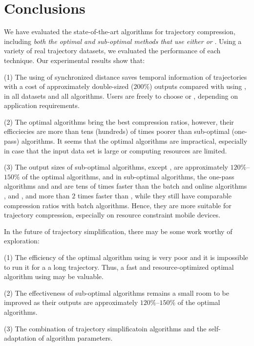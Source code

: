 \vspace{-1ex}
\section{Conclusions}

We have evaluated the state-of-the-art \lsa algorithms for trajectory compression, including \emph{both the optimal and sub-optimal methods that use either \ped or \sed}. 
Using a variety of real trajectory datasets, we evaluated the performance of each technique. %
Our experimental results show that: 

(1) The using of synchronized distance \sed saves temporal information of trajectories with a cost of approximately double-sized (\ie $200\%$) outputs compared with using \ped, in all datasets and all algorithms. Users are freely to choose \sed or \ped, depending on application requirements.

(2) The optimal algorithms bring the best compression ratios, however, their efficciecies are more than tens (hundreds) of times poorer than sub-optimal (one-pass) algorithms. It seems that the optimal algorithms are impractical, especially in case that the input data set is large or computing resources are limited.

(3) The output sizes of sub-optimal algorithms, except \squishe, are approximately $120\%$--$150\%$ of the optimal algorithms, and in sub-optimal algorithms, the one-pass algorithms \siped and \operb and \cised are tens of times faster than the batch and online algorithms \tpa, \dpa and \bqsa, and more than $2$ times faster than \squishe, while they still have comparable compression ratios with batch algorithms. Hence, they are more suitable for trajectory compression, especially on resource constraint mobile devices.

In the future of trajectory simplification, there may be some work worthy of exploration:

(1) The efficiency of the optimal algorithm using \sed is very poor and it is impossible to run it for a a long trajectory. Thus, a fast and resource-optimized optimal algorithm using \sed may be valuable.

(2) The effectiveness of sub-optimal algorithms remains a small room to be improved as their outputs are approximately $120\%$--$150\%$ of the optimal algorithms.

(3) The combination of trajectory simplificatoin algorithms and the self-adaptation of algorithm parameters.

